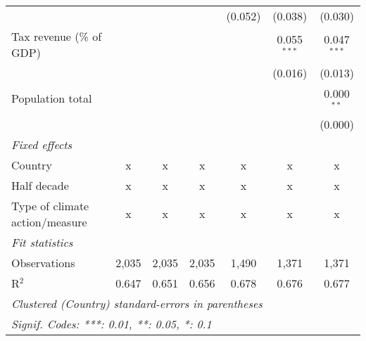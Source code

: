 \begin{tabular}{lcccccc}
                                                     &         &                &                & (0.052)        & (0.038)        & (0.030)\\   
   Tax revenue (\% of GDP)                           &         &                &                &                & 0.055$^{***}$  & 0.047$^{***}$\\   
                                                     &         &                &                &                & (0.016)        & (0.013)\\   
   Population total                                  &         &                &                &                &                & 0.000$^{**}$\\   
                                                     &         &                &                &                &                & (0.000)\\   
   \emph{Fixed effects}\\
   Country                                           & x       & x              & x              & x              & x              & x\\  
   Half decade                                       & x       & x              & x              & x              & x              & x\\  
   Type of climate action/measure                    & x       & x              & x              & x              & x              & x\\  
   \midrule \emph{Fit statistics}\\
   Observations                                      & 2,035   & 2,035          & 2,035          & 1,490          & 1,371          & 1,371\\  
   R$^2$                                             & 0.647   & 0.651          & 0.656          & 0.678          & 0.676          & 0.677\\  
   \midrule
   \multicolumn{7}{l}{\emph{Clustered (Country) standard-errors in parentheses}}\\
   \multicolumn{7}{l}{\emph{Signif. Codes: ***: 0.01, **: 0.05, *: 0.1}}\\
\end{tabular}
\par\endgroup


